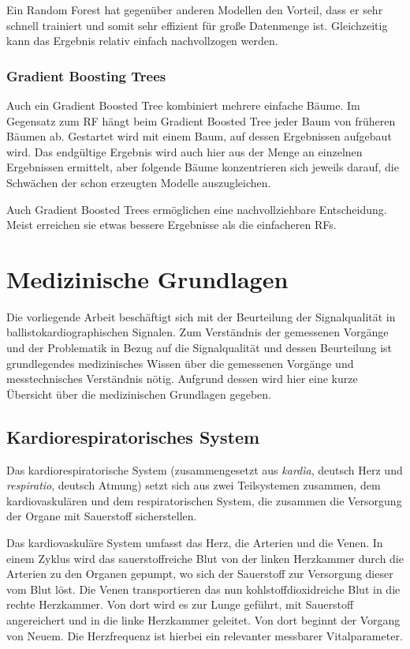 		Ein Random Forest hat gegenüber anderen Modellen den Vorteil, dass er sehr schnell trainiert und somit sehr effizient für große Datenmenge ist. Gleichzeitig kann das Ergebnis relativ einfach nachvollzogen werden.
		
		\subsubsection{Gradient Boosting Trees}
		
		Auch ein Gradient Boosted Tree kombiniert mehrere einfache Bäume. Im Gegensatz zum \ac{RF} hängt beim Gradient Boosted Tree jeder Baum von früheren Bäumen ab. Gestartet wird mit einem Baum, auf dessen Ergebnissen aufgebaut wird. Das endgültige Ergebnis wird auch hier aus der Menge an einzelnen Ergebnissen ermittelt, aber folgende Bäume konzentrieren sich jeweils darauf, die Schwächen der schon erzeugten Modelle auszugleichen.
		
		Auch Gradient Boosted Trees ermöglichen eine nachvollziehbare Entscheidung. Meist erreichen sie etwas bessere Ergebnisse als die einfacheren \acl{RF}s.

\section{Medizinische Grundlagen}\label{med-grundlagen}

Die vorliegende Arbeit beschäftigt sich mit der Beurteilung der Signalqualität in ballistokardiographischen Signalen. Zum Verständnis der gemessenen Vorgänge und der Problematik in Bezug auf die Signalqualität und dessen Beurteilung ist grundlegendes medizinisches Wissen über die gemessenen Vorgänge und messtechnisches Verständnis nötig. Aufgrund dessen wird hier eine kurze Übersicht über die medizinischen Grundlagen gegeben.

	\subsection{Kardiorespiratorisches System}
	
	Das kardiorespiratorische System (zusammengesetzt aus \textit{kardìa}, deutsch \glq Herz\grq{} und \textit{respiratio}, deutsch \glq Atmung\grq) setzt sich aus zwei Teilsystemen zusammen, dem kardiovaskulären und dem respiratorischen System, die zusammen die Versorgung der Organe mit Sauerstoff sicherstellen.
	
	Das kardiovaskuläre System umfasst das Herz, die Arterien und die Venen. In einem Zyklus wird das sauerstoffreiche Blut von der linken Herzkammer durch die Arterien zu den Organen gepumpt, wo sich der Sauerstoff zur Versorgung dieser vom Blut löst. Die Venen transportieren das nun kohlstoffdioxidreiche Blut in die rechte Herzkammer. Von dort wird es zur Lunge geführt, mit Sauerstoff angereichert und in die linke Herzkammer geleitet. Von dort beginnt der Vorgang von Neuem. Die Herzfrequenz ist hierbei ein relevanter messbarer Vitalparameter.
	
